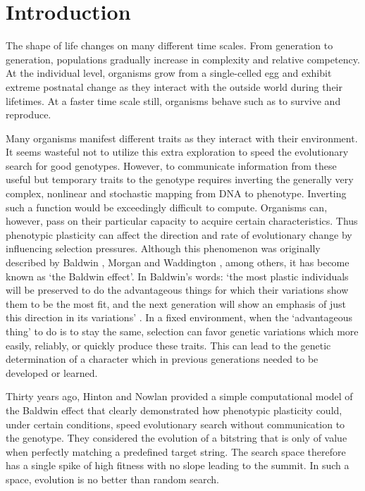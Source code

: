
\section{Introduction}
\label{sec4:intro}


The shape of life changes on many different time scales.
From generation to generation, populations gradually increase in complexity and relative competency.
At the individual level, organisms grow from a single-celled egg and exhibit extreme postnatal change as they interact with the outside world during their lifetimes.
At a faster time scale still, organisms behave such as to survive and reproduce.

Many organisms manifest different traits as they interact with their environment.
It seems wasteful not to utilize this extra exploration to speed the evolutionary search for good genotypes. 
However, to communicate information from these useful but temporary traits to the genotype requires inverting the generally very complex, nonlinear and stochastic mapping from DNA to phenotype.
Inverting such a function would be exceedingly difficult to compute.
Organisms can, however,
pass on their particular capacity to acquire certain characteristics. 
Thus phenotypic plasticity can affect the direction and rate of evolutionary change by influencing selection pressures.
Although this phenomenon was originally described by Baldwin \cite{baldwin1896new}, Morgan \cite{morgan1896modification} and Waddington \cite{waddington1942canalization}, among others, it has become known as `the Baldwin effect'.
In Baldwin's words:
`the most plastic individuals will be preserved to do the advantageous things for which their variations show them to be the most fit, and the next generation will show an emphasis of just this direction in its variations' \cite{baldwin1896new}.
In a fixed environment, when the `advantageous thing' to do is to stay the same, selection can favor genetic variations which more easily, reliably, or quickly produce these traits. 
This can lead to the genetic determination of a character which in previous generations needed to be developed or learned.


Thirty years ago, Hinton and Nowlan \cite{hinton1987learning} provided a simple computational model of the Baldwin effect that clearly demonstrated how phenotypic plasticity could, under certain conditions, speed evolutionary search without communication to the genotype.
They considered the evolution of a bitstring that is only of value when perfectly matching a predefined target string.
The search space therefore has a single spike of high fitness with no slope leading to the summit.
In such a space, evolution is no better than random search.


